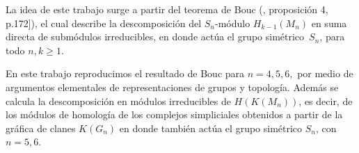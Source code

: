 \documentclass[12pt]{book}
\theoremstyle{definition}
\newcounter{in}
\newcounter{ini}
\begin{document}
La idea de este trabajo surge a partir del teorema de Bouc
(\cite{MR756517}, proposición 4, p.172]), el cual describe
la descomposición del $S_{n}$-módulo $H_{k-1}(M_{n})$ en
suma directa de submódulos irreducibles, en donde actúa el grupo
simétrico~$S_{n}$, para todo $n,k\geq1$.

En este trabajo reproducimos el resultado de Bouc para $n=4,5,6,$ por
medio de argumentos elementales de representaciones de grupos y
topología. Además se calcula la descomposición en módulos irreducibles
de $H(K(M_{n}))$, es decir, de los módulos de homología de
los complejos simpliciales obtenidos a partir de la gráfica de clanes
$K(G_{n})$ en donde también actúa el grupo simétrico $S_{n}$, con
$n=5,6$.




\end{document}
